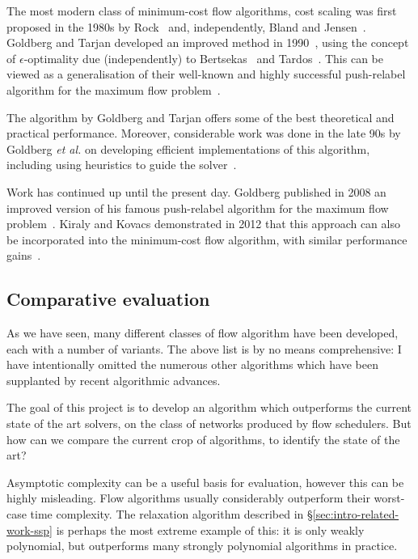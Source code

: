 The most modern class of minimum-cost flow algorithms, cost scaling was first proposed in the 1980s by Rock~\cite{Rock:1980} and, independently, Bland and Jensen~\cite{Bland:1985}. Goldberg and Tarjan developed an improved method in 1990~\cite{Goldberg:1990}, using the concept of $\epsilon$-optimality due (independently) to Bertsekas~\cite{Bertsekas:1979} and Tardos~\cite{Tardos:1985}. This can be viewed as a generalisation of their well-known and highly successful push-relabel algorithm for the maximum flow problem~\cite{Goldberg:1988}.

The algorithm by Goldberg and Tarjan offers some of the best theoretical and practical performance. Moreover, considerable work was done in the late 90s by Goldberg \textit{et al.} on developing efficient implementations of this algorithm, including using heuristics to guide the solver~\cite{Goldberg:1997,Bunnagel:1998}.

Work has continued up until the present day. Goldberg published in 2008 an improved version of his famous push-relabel algorithm for the maximum flow problem~\cite{Goldberg:2008}. Kiraly and Kovacs demonstrated in 2012 that this approach can also be incorporated into the minimum-cost flow algorithm, with similar performance gains~\cite{KiralyKovacs:2012}.

\subsection{Comparative evaluation}

As we have seen, many different classes of flow algorithm have been developed, each with a number of variants. The above list is by no means comprehensive: I have intentionally omitted the numerous other algorithms which have been supplanted by recent algorithmic advances.

The goal of this project is to develop an algorithm which outperforms the current state of the art solvers, on the class of networks produced by flow schedulers. But how can we compare the current crop of algorithms, to identify the state of the art? 

Asymptotic complexity can be a useful basis for evaluation, however this can be highly misleading. Flow algorithms usually considerably outperform their worst-case time complexity. The relaxation algorithm described in \S\ref{sec:intro-related-work-ssp} is perhaps the most extreme example of this: it is only weakly polynomial, but outperforms many strongly polynomial algorithms in practice.

